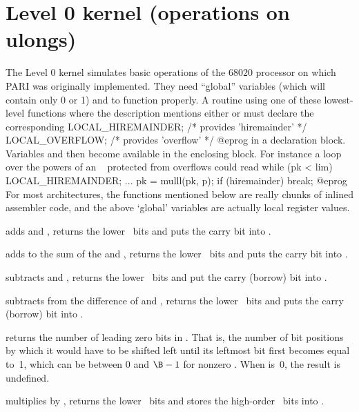 \section{Level 0 kernel (operations on ulongs)}

The Level 0 kernel simulates basic operations of the 68020 processor on which
PARI was originally implemented. They need ``global''  variables
 (which will contain only 0 or 1) and  to
function properly. A routine using one of these lowest-level functions
where the description mentions either  or 
must declare the corresponding
\bprog
  LOCAL_HIREMAINDER;  /* provides 'hiremainder' */
  LOCAL_OVERFLOW;     /* provides 'overflow' */
@eprog\noindent
in a declaration block. Variables  and  then
become available in the enclosing block. For instance a loop over the powers
of an ~ protected from overflows could read
\bprog
 while (pk < lim)
 {
   LOCAL_HIREMAINDER;
   ...
   pk = mulll(pk, p); if (hiremainder) break;
 }
@eprog\noindent
For most architectures, the functions mentioned below are really chunks of
inlined assembler code, and the above `global' variables are actually
local register values.

 adds  and , returns the
lower \B\ bits and puts the carry bit into .

 adds  to the sum of the
 and , returns the lower \B\ bits and puts the carry bit into
.

 subtracts  and , returns
the lower \B\ bits and put the carry (borrow) bit into .

 subtracts  from the
difference of  and , returns the lower \B\ bits and puts the
carry (borrow) bit into .

 returns the number of leading zero bits in .
That is, the number of bit positions by which it would have to be shifted
left until its leftmost bit first becomes equal to~1, which can be between 0
and $\B-1$ for nonzero . When  is~0, the result is undefined.

 multiplies  by , returns
the lower \B\ bits and stores the high-order \B\ bits into .

